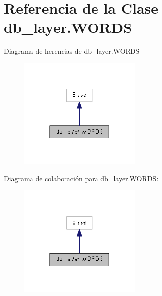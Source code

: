 \hypertarget{classdb__layer_1_1_w_o_r_d_s}{\section{Referencia de la Clase db\-\_\-layer.\-W\-O\-R\-D\-S}
\label{classdb__layer_1_1_w_o_r_d_s}
}


Diagrama de herencias de db\-\_\-layer.\-W\-O\-R\-D\-S\nopagebreak
\begin{figure}[H]
\begin{center}
\leavevmode
\includegraphics[width=170pt]{classdb__layer_1_1_w_o_r_d_s__inherit__graph}
\end{center}
\end{figure}


Diagrama de colaboración para db\-\_\-layer.\-W\-O\-R\-D\-S\-:\nopagebreak
\begin{figure}[H]
\begin{center}
\leavevmode
\includegraphics[width=170pt]{classdb__layer_1_1_w_o_r_d_s__coll__graph}
\end{center}
\end{figure}
